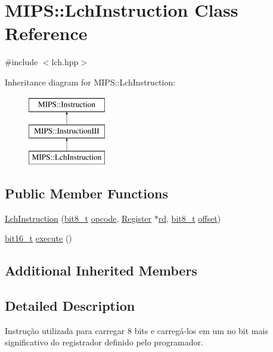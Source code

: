 \hypertarget{classMIPS_1_1LchInstruction}{}\section{M\+I\+PS\+:\+:Lch\+Instruction Class Reference}
\label{classMIPS_1_1LchInstruction}


{\ttfamily \#include $<$lch.\+hpp$>$}

Inheritance diagram for M\+I\+PS\+:\+:Lch\+Instruction\+:\begin{figure}[H]
\begin{center}
\leavevmode
\includegraphics[height=3.000000cm]{classMIPS_1_1LchInstruction}
\end{center}
\end{figure}
\subsection*{Public Member Functions}
\begin{DoxyCompactItemize}
\item 
\hyperlink{classMIPS_1_1LchInstruction_a6e565d4fb7708e974d0e475bd3fabfa7}{Lch\+Instruction} (\hyperlink{core_8hpp_a6074bae122ae7b527864eec42c728c3c}{bit8\+\_\+t} \hyperlink{classMIPS_1_1Instruction_a45cc6808b5dde8a5d41067d148b55476}{opcode}, \hyperlink{classMIPS_1_1Register}{Register} $\ast$\hyperlink{classMIPS_1_1InstructionIII_a76e7b218fc57cd2fc559bf72498090b6}{rd}, \hyperlink{core_8hpp_a6074bae122ae7b527864eec42c728c3c}{bit8\+\_\+t} \hyperlink{classMIPS_1_1InstructionIII_ad0ebd3b6e7594fc583e9a409bf99a6c7}{offset})
\item 
\hyperlink{core_8hpp_adc265a970bc35995b5879784bbb3f1b7}{bit16\+\_\+t} \hyperlink{classMIPS_1_1LchInstruction_a6dad60c9189a1e84fd7c789b9642077d}{execute} ()
\end{DoxyCompactItemize}
\subsection*{Additional Inherited Members}


\subsection{Detailed Description}
Instrução utilizada para carregar 8 bits e carregá-\/los em um no bit mais significativo do registrador definido pelo programador.

